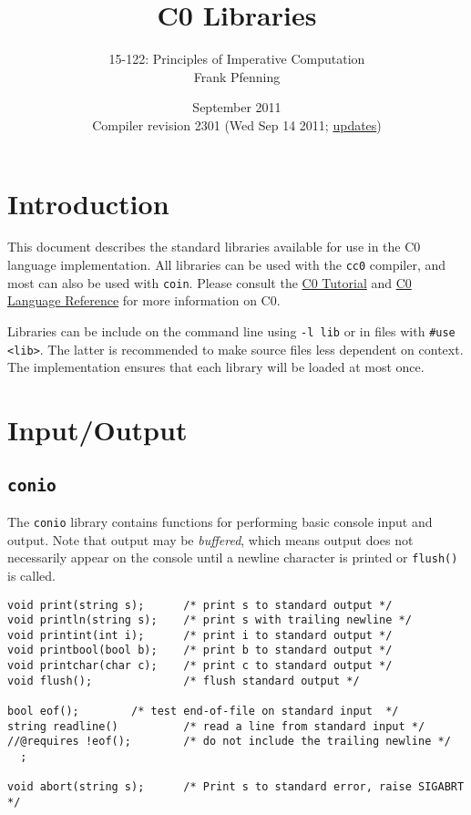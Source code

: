 \documentclass[11pt]{article}
\title{C0 Libraries}
\author{15-122: Principles of Imperative Computation \\ Frank Pfenning}
\date{September 2011\\Compiler revision 2301 (Wed Sep 14 2011;
  \hyperlink{sec:updates}{updates})}
\begin{document}
\maketitle

\section{Introduction}

This document describes the standard libraries available for use
in the C0 language implementation.  All libraries can be used
with the \verb'cc0' compiler, and most can also be used with
\verb'coin'.   Please consult the
\href{http://c0.typesafety.net/tutorial}{C0 Tutorial} and
\href{http://c0.typesafety.net/doc/c0-reference.pdf}{C0 Language
Reference} for more information on C0.

Libraries can be include on the command line using \verb'-l lib' or in
files with \verb'#use <lib>'.  The latter is recommended to make
source files less dependent on context.  The implementation ensures
that each library will be loaded at most once.

\section{Input/Output}

\subsection{\tt conio}

The \verb'conio' library contains functions for performing basic
console input and output.  Note that output may be \emph{buffered},
which means output does not necessarily appear on the console
until a newline character is printed or \verb'flush()' is called.

\begin{small}
\begin{verbatim}
void print(string s);      /* print s to standard output */
void println(string s);    /* print s with trailing newline */
void printint(int i);      /* print i to standard output */
void printbool(bool b);    /* print b to standard output */
void printchar(char c);    /* print c to standard output */
void flush();              /* flush standard output */

bool eof();		   /* test end-of-file on standard input  */
string readline()          /* read a line from standard input */
//@requires !eof();        /* do not include the trailing newline */
  ;

void abort(string s);      /* Print s to standard error, raise SIGABRT */
\end{verbatim}
\end{small}
\end{document}
